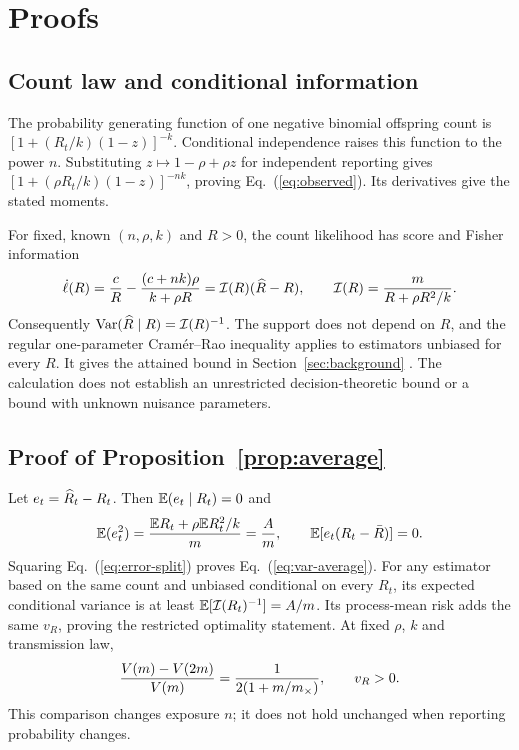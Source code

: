 \clearpage
\appendix
{}
\renewcommand{\theequation}{\thesection.\arabic{equation}}

\section{Proofs}
\label{app:proofs}

\subsection{Count law and conditional information}
\label{app:model}
\label{app:target1}

The probability generating function of one negative binomial offspring count is $[1+(R_t/k)(1-z)]^{-k}$. Conditional independence raises this function to the power $n$. Substituting $z\mapsto1-\rho+\rho z$ for independent reporting gives $[1+(\rho R_t/k)(1-z)]^{-nk}$, proving Eq.~(\ref{eq:observed}). Its derivatives give the stated moments.

For fixed, known $(n,\rho,k)$ and $R>0$, the count likelihood has score and Fisher information
\begin{equation}
 \dot\ell(R)=\frac{c}{R}-\frac{(c+nk)\rho}{k+\rho R}
 =\mathcal I(R)(\widehat R-R),\qquad
 \mathcal I(R)=\frac{m}{R+\rho R^2/k}.
 \label{eq:score}
\end{equation}
Consequently $\mathrm{Var}(\widehat R\mid R)=\mathcal I(R)^{-1}$. The support does not depend on $R$, and the regular one-parameter Cram\'er--Rao inequality applies to estimators unbiased for every $R$. It gives the attained bound in Section~\ref{sec:background} \citep{lehmann1998theory}. The calculation does not establish an unrestricted decision-theoretic bound or a bound with unknown nuisance parameters.

\subsection{Proof of Proposition~\ref{prop:average}}
\label{app:prop1}

Let $e_t=\widehat R_t-R_t$. Then $\mathbb{E}(e_t\mid R_t)=0$ and
\begin{equation}
 \mathbb{E}(e_t^2)=\frac{\mathbb{E} R_t+\rho\mathbb{E} R_t^2/k}{m}=\frac{A}{m},
 \qquad \mathbb{E}[e_t(R_t-\bar R)]=0.
\end{equation}
Squaring Eq.~(\ref{eq:error-split}) proves Eq.~(\ref{eq:var-average}). For any estimator based on the same count and unbiased conditional on every $R_t$, its expected conditional variance is at least $\mathbb{E}[\mathcal I(R_t)^{-1}]=A/m$. Its process-mean risk adds the same $v_R$, proving the restricted optimality statement. At fixed $\rho$, $k$ and transmission law,
\begin{equation}
 \frac{V(m)-V(2m)}{V(m)}=\frac{1}{2(1+m/m_{\times})},\qquad v_R>0.
\end{equation}
This comparison changes exposure $n$; it does not hold unchanged when reporting probability changes.

